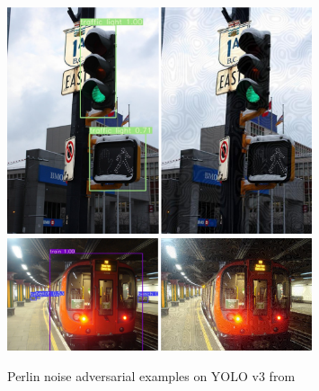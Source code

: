 \begin{figure}[h]
    \centering
    \includegraphics[width=0.8\textwidth]{Experiments/imgs/semaforo.png}
    \includegraphics[width=0.8\textwidth]{Experiments/imgs/treno.png}
    \caption{Perlin noise adversarial examples on YOLO v3 from \cite{procNoise_co2019}}
    \label{fig:procnoise_samples}
\end{figure}



